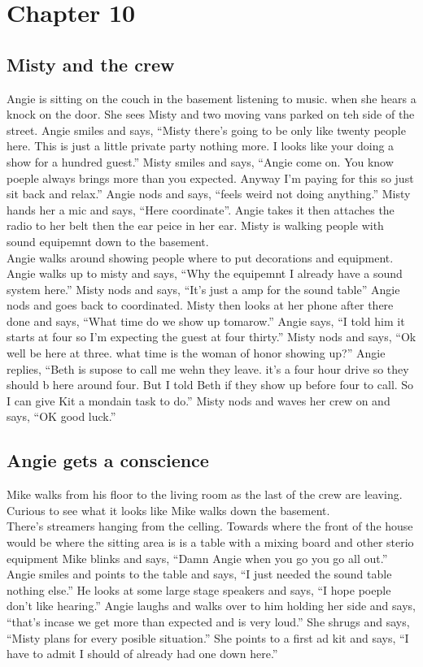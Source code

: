 \documentclass {article}[12pt]
\begin{document}
\section* {Chapter 10}
\subsection* {Misty and the crew}
Angie is sitting on the couch in the basement listening to music. when she hears a knock on the door. She sees Misty and two moving vans parked on teh side of the street. Angie smiles and says, ``Misty there's going to be only like twenty people here. This is just a little private party nothing more. I looks like your doing a show for a hundred guest.'' Misty smiles and says, ``Angie come on. You know poeple always brings more than you expected. Anyway I'm paying for this so just sit back and relax.'' Angie nods and says, ``feels weird not doing anything.'' Misty hands her a mic and says, ``Here coordinate''.  Angie takes it then attaches the radio to her belt then the ear peice in her ear. Misty is walking people with sound equipemnt down to the basement.\\

	Angie walks around showing people where to put decorations and equipment. Angie walks up to misty and says, ``Why the equipemnt I already have a sound system here.'' Misty nods and says, ``It's just a amp for the sound table'' Angie nods and goes back to coordinated. Misty then looks at her phone after there done and says, ``What time do we show up tomarow.'' Angie says, ``I told him it starts at four so I'm expecting the guest at four thirty.'' Misty nods and says, ``Ok well be here at three. what time is the woman of honor showing up?'' Angie replies, ``Beth is supose to call me wehn they leave. it's a four hour drive so they should b here around four. But I told Beth if they show up before four to call. So I can give Kit a mondain task to do.'' Misty nods and waves her crew on and says, ``OK good luck.''\\
	
\subsection* {Angie gets a conscience}
	Mike walks from his floor to the living room as the last of the crew are leaving. Curious to see what it looks like Mike walks down the basement.\\

	There's streamers hanging from the celling. Towards where the front of the house would be where the sitting area is is a table with a mixing board and other sterio equipment Mike blinks and says, ``Damn Angie when you go you go all out.'' Angie smiles and points to the table and says, ``I just needed the sound table nothing else.'' He looks at some large stage speakers and says, ``I hope poeple don't like hearing.'' Angie laughs and walks over to him holding her side and says, ``that's incase we get more than expected and is very loud.'' She shrugs and says, ``Misty plans for every posible situation.'' She points to a first ad kit and says, ``I have to admit I should of already had one down here.''\\
	
\end{document}
